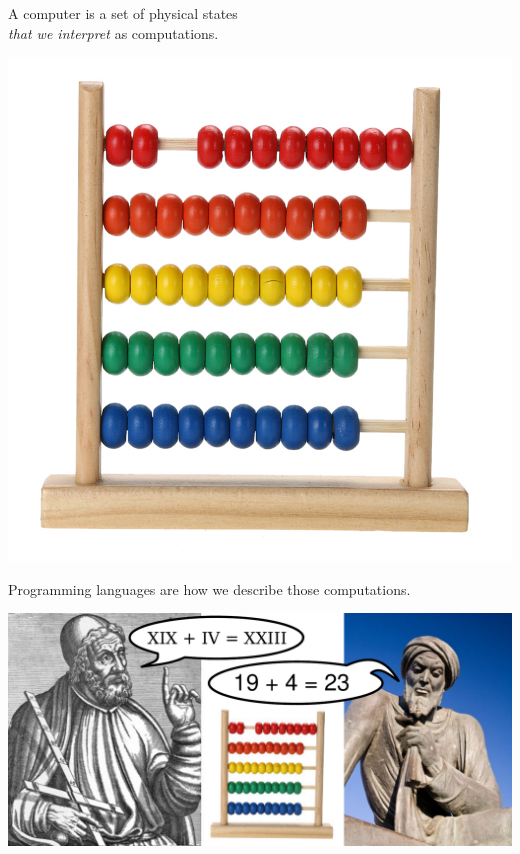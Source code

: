 \documentclass[aspectratio=169]{beamer}
\begin{document}
\begin{frame}{}
\LARGE
\vspace{1 cm}
\begin{center}
A computer is a set of physical states \\ {\it that we interpret} as computations.

\vspace{0.2 cm}
\includegraphics[width=0.4\linewidth]{abacus.jpg}
\end{center}
\end{frame}

\begin{frame}{Programming languages are how we describe those computations.}
\Large
\vspace{0.1 cm}
\begin{center}
\end{center}

\vspace{0.1 cm}
\includegraphics[width=\linewidth]{abacus_ptolemy_al-khwarizmi.pdf}
\end{frame}
\end{document}
